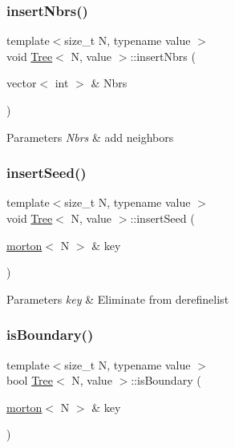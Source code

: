 \mbox{\label{classTree_acbedf93a6977d60abc4f08c789c7c30e}} 
\subsubsection{\texorpdfstring{insert\+Nbrs()}{insertNbrs()}}
{\footnotesize\ttfamily template$<$size\+\_\+t N, typename value $>$ \\
void \mbox{\hyperlink{classTree}{Tree}}$<$ N, value $>$\+::insert\+Nbrs (\begin{DoxyParamCaption}\item[{vector$<$ int $>$ \&}]{Nbrs }\end{DoxyParamCaption})}


\begin{DoxyParams}{Parameters}
{\em Nbrs} & add neighbors \\
\hline
\end{DoxyParams}
\mbox{\label{classTree_a9e11471977b8d0079c204b858357f339}} 
\subsubsection{\texorpdfstring{insert\+Seed()}{insertSeed()}}
{\footnotesize\ttfamily template$<$size\+\_\+t N, typename value $>$ \\
void \mbox{\hyperlink{classTree}{Tree}}$<$ N, value $>$\+::insert\+Seed (\begin{DoxyParamCaption}\item[{\mbox{\hyperlink{definitions_8h_af8682350bd8bb38ee9023f7a0a310add}{morton}}$<$ N $>$ \&}]{key }\end{DoxyParamCaption})}


\begin{DoxyParams}{Parameters}
{\em key} & Eliminate from derefinelist \\
\hline
\end{DoxyParams}
\mbox{\label{classTree_a48d8a704bb776cb9720e53b4e849abc5}} 
\subsubsection{\texorpdfstring{is\+Boundary()}{isBoundary()}\hspace{0.1cm}{\footnotesize\ttfamily [1/2]}}
{\footnotesize\ttfamily template$<$size\+\_\+t N, typename value $>$ \\
bool \mbox{\hyperlink{classTree}{Tree}}$<$ N, value $>$\+::is\+Boundary (\begin{DoxyParamCaption}\item[{\mbox{\hyperlink{definitions_8h_af8682350bd8bb38ee9023f7a0a310add}{morton}}$<$ N $>$ \&}]{key }\end{DoxyParamCaption})}

